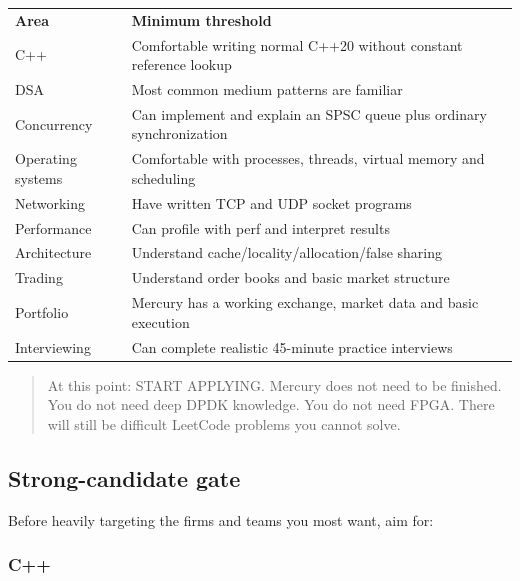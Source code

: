 \documentclass[11pt,letterpaper]{article}
\begin{document}
\begin{center}
\small
\begin{tabular}{>{\raggedright\arraybackslash}p{}>{\raggedright\arraybackslash}p{}}
\textbf{Area} & \textbf{Minimum threshold} \\
C++ & Comfortable writing normal C++20 without constant reference lookup \\
DSA & Most common medium patterns are familiar \\
Concurrency & Can implement and explain an SPSC queue plus ordinary synchronization \\
Operating systems & Comfortable with processes, threads, virtual memory and scheduling \\
Networking & Have written TCP and UDP socket programs \\
Performance & Can profile with perf and interpret results \\
Architecture & Understand cache/locality/allocation/false sharing \\
Trading & Understand order books and basic market structure \\
Portfolio & Mercury has a working exchange, market data and basic execution \\
Interviewing & Can complete realistic 45-minute practice interviews \\
\end{tabular}
\end{center}

\begin{quote}
At this point: START APPLYING. Mercury does not need to be finished. You do not need deep DPDK knowledge. You do not need FPGA. There will still be difficult LeetCode problems you cannot solve.
\end{quote}

\clearpage
\subsection*{Strong-candidate gate}

Before heavily targeting the firms and teams you most want, aim for:

\subsubsection*{C++}
\end{document}
